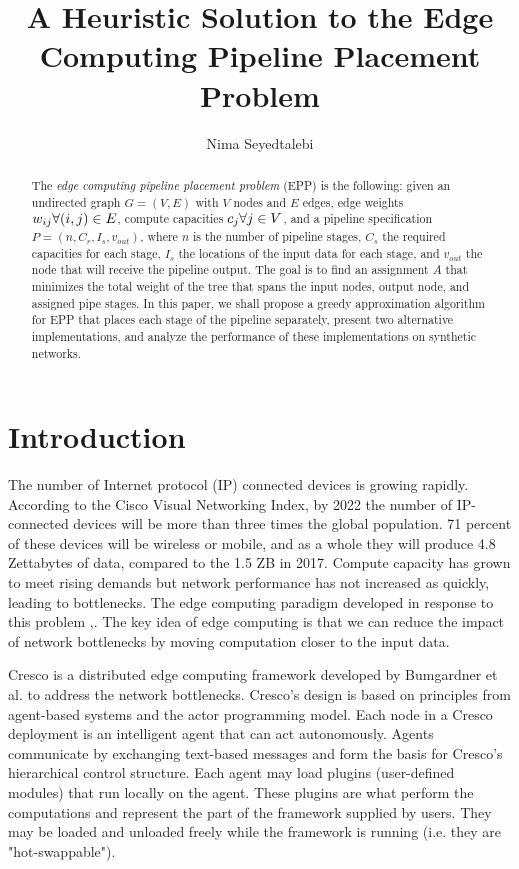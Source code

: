 \documentclass{article}
\author{Nima Seyedtalebi}
\title{A Heuristic Solution to the Edge Computing Pipeline Placement Problem}
\newcommand{\forallv}[1]{\ensuremath{\forall #1 \in V}}
\newcommand{\foralle}[2]{\ensuremath{\forall (#1,#2) \in E }}
\begin{document}
	\maketitle
	\begin{abstract}
		The \textit{edge computing pipeline placement problem} (EPP) is the following: given an undirected graph $G=(V,E)$ with $V$ nodes and $E$ edges, edge weights $w_{ij} \space \foralle{i}{j}$, compute capacities $c_{j} \space \forallv{j}$, and a pipeline specification $P = (n,C_{r},I_{s},v_{out})$, where  $n$ is the number of pipeline stages, $C_{s}$ the required capacities for each stage, $I_{s}$ the locations of the input data for each stage, and $v_{out}$ the node that will receive the pipeline output. The goal is to find an assignment $A$ that minimizes the total weight of the tree that spans the input nodes, output node, and assigned pipe stages. In this paper, we shall propose a greedy approximation algorithm for EPP that places each stage of the pipeline separately, present two alternative implementations, and analyze the performance of these implementations on synthetic networks.
	\end{abstract}
	
	\section{Introduction}
	The number of Internet protocol (IP) connected devices is growing rapidly. According to the Cisco Visual Networking Index, by 2022 the number of IP-connected devices will be more than three times the global population. 71 percent of these devices will be wireless or mobile, and as a whole they will produce 4.8 Zettabytes of data, compared to the 1.5 ZB in 2017.\cite{ciscoVNI} Compute capacity has grown to meet rising demands but network performance has not increased as quickly, leading to bottlenecks. The edge computing paradigm developed in response to this problem \cite{edgeEmerge},\cite{edgePromise}. The key idea of edge computing is that we can reduce the impact of network bottlenecks by moving computation closer to the input data.
	
	Cresco is a distributed edge computing framework developed by Bumgardner et al.\cite{bumgardner2016cresco} to address the network bottlenecks. Cresco's design is based on principles from agent-based systems and the actor programming model. Each node in a Cresco deployment is an intelligent agent that can act autonomously. Agents communicate by exchanging text-based messages and form the basis for Cresco's hierarchical control structure. Each agent may load plugins (user-defined modules) that run locally on the agent. These plugins are what perform the computations and represent the part of the framework supplied by users. They may be loaded and unloaded freely while the framework is running (i.e. they are "hot-swappable").
	
\end{document}
